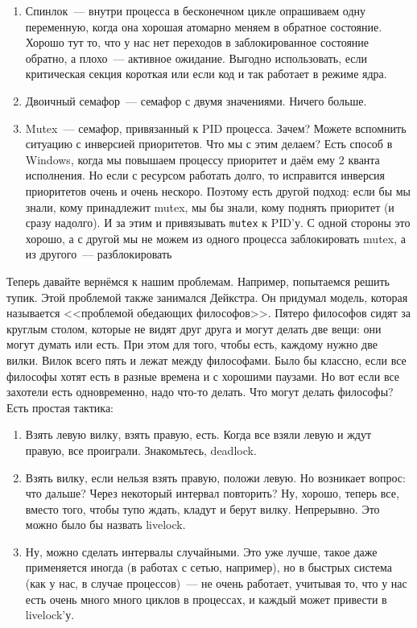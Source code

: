 \documentclass{article}
\begin{document}
    \begin{enumerate}
        \item Спинлок~--- внутри процесса в бесконечном цикле опрашиваем одну переменную, когда она хорошая атомарно меняем в обратное состояние.\\
        Хорошо тут то, что у нас нет переходов в заблокированное состояние обратно, а плохо~--- активное ожидание. Выгодно использовать, если критическая секция короткая или если код и так работает в режиме ядра.
        \item Двоичный семафор~--- семафор с двумя значениями. Ничего больше.
        \item Mutex~--- семафор, привязанный к PID процесса. Зачем? Можете вспомнить ситуацию с инверсией приоритетов. Что мы с этим делаем? Есть способ в Windows, когда мы повышаем процессу приоритет и даём ему 2 кванта исполнения. Но если с ресурсом работать долго, то исправится инверсия приоритетов очень и очень нескоро. Поэтому есть другой подход: если бы мы знали, кому принадлежит mutex, мы бы знали, кому поднять приоритет (и сразу надолго). И за этим и привязывать \Verb|mutex| к PID'у. С одной стороны это хорошо, а с другой мы не можем из одного процесса заблокировать mutex, а из другого~--- разблокировать
    \end{enumerate}
    Теперь давайте вернёмся к нашим проблемам. Например, попытаемся решить тупик. Этой проблемой также занимался Дейкстра. Он придумал модель, которая называется <<проблемой обедающих философов>>. Пятеро философов сидят за круглым столом, которые не видят друг друга и могут делать две вещи: они могут думать или есть. При этом для того, чтобы есть, каждому нужно две вилки. Вилок всего пять и лежат между философами. Было бы классно, если все философы хотят есть в разные времена и с хорошими паузами. Но вот если все захотели есть одновременно, надо что-то делать. Что могут делать философы? Есть простая тактика:
    \begin{enumerate}
        \item Взять левую вилку, взять правую, есть. Когда все взяли левую и ждут правую, все проиграли. Знакомьтесь, deadlock.
        \item Взять вилку, если нельзя взять правую, положи левую. Но возникает вопрос: что дальше? Через некоторый интервал повторить? Ну, хорошо, теперь все, вместо того, чтобы тупо ждать, кладут и берут вилку. Непрерывно. Это можно было бы назвать livelock.
        \item Ну, можно сделать интервалы случайными. Это уже лучше, такое даже применяется иногда (в работах с сетью, например), но в быстрых система (как у нас, в случае процессов)~--- не очень работает, учитывая то, что у нас есть очень много много циклов в процессах, и каждый может привести в livelock'у.
    \end{enumerate}
\end{document}
